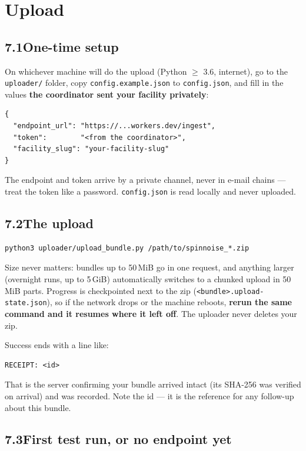 \documentclass[11pt]{article}
\newcommand{\file}[1]{\texttt{#1}}
\begin{document}
\section{Upload}

\subsection*{7.1\quad One-time setup}

On whichever machine will do the upload (Python $\geq$ 3.6, internet), go to
the \file{uploader/} folder, copy \file{config.example.json} to
\file{config.json}, and fill in the values \textbf{the coordinator sent your
facility privately}:
\begin{lstlisting}
{
  "endpoint_url": "https://...workers.dev/ingest",
  "token":        "<from the coordinator>",
  "facility_slug": "your-facility-slug"
}
\end{lstlisting}
The endpoint and token arrive by a private channel, never in e-mail chains
--- treat the token like a password. \file{config.json} is read locally and
never uploaded.

\subsection*{7.2\quad The upload}

\begin{lstlisting}
python3 uploader/upload_bundle.py /path/to/spinnoise_*.zip
\end{lstlisting}

Size never matters: bundles up to 50\,MiB go in one request, and anything
larger (overnight runs, up to 5\,GiB) automatically switches to a chunked
upload in 50\,MiB parts. Progress is checkpointed next to the zip
(\file{<bundle>.upload-state.json}), so if the network drops or the machine
reboots, \textbf{rerun the same command and it resumes where it left off}.
The uploader never deletes your zip.

Success ends with a line like:
\begin{lstlisting}
RECEIPT: <id>
\end{lstlisting}
That is the server confirming your bundle arrived intact (its SHA-256 was
verified on arrival) and was recorded. Note the id --- it is the reference
for any follow-up about this bundle.

\subsection*{7.3\quad First test run, or no endpoint yet}
\end{document}

